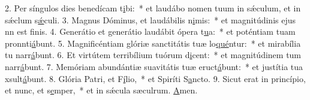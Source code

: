 2. Per síngulos dies benedícam t\uline{i}bi:~* et laudábo nomen tuum in sǽculum, et in sǽclum s\uline{ǽ}culi.
3. Magnus Dóminus, et laudábilis n\uline{i}mis:~* et magnitúdinis ejus nn est f\uline{i}nis.
4. Generátio et generátio laudábit ópera t\uline{u}a:~* et poténtiam tuam pronnti\uline{á}bunt.
5. Magnificéntiam glóriæ sanctitátis tuæ lo\uline{qué}ntur:~* et mirabília tu narr\uline{á}bunt.
6. Et virtútem terribílium tuórum d\uline{i}cent:~* et magnitúdinem tum narr\uline{á}bunt.
7. Memóriam abundántiæ suavitátis tuæ eruct\uline{á}bunt:~* et justítia tua xsult\uline{á}bunt.
8. Glória Patri, et F\uline{í}lio,~* et Spiríti S\uline{a}ncto.
9. Sicut erat in princípio, et nunc, et s\uline{e}mper,~* et in sǽcula sæculrum. \uline{A}men.
